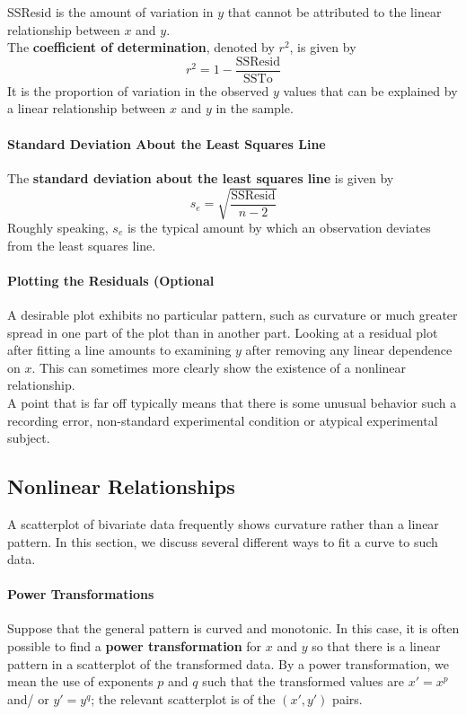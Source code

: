 \documentclass{article}
\newcommand{\p}[1]{\paragraph{#1}} %
\begin{document}
		SSResid is the amount of variation in $y$ that cannot be attributed to the linear 
		relationship between $x$ and $y$. \\
		
		The \textbf{coefficient of determination}, denoted by $r^2$, is given by
		\[ r^2 = 1- \frac{\text{SSResid}}{\text{SSTo}} \]
		It is the proportion of variation in the observed $y$ values that can be explained by a linear 
		relationship between $x$ and $y$ in the sample.
		
	\p{Standard Deviation About the Least Squares Line}
		The \textbf{standard deviation about the least squares line} is given by
		\[ s_e = \sqrt{\frac{\text{SSResid}}{n-2}} \]
		Roughly speaking, $s_e$ is the typical amount by which an observation deviates from the 
		least squares line.
		
	\p{Plotting the Residuals (Optional}
		A desirable plot exhibits no particular pattern, such as curvature or much greater spread in 
		one part of the plot than in another part. Looking at a residual plot after fitting a line 
		amounts to examining $y$ after removing any linear dependence on $x$. This can 
		sometimes more clearly show the existence of a nonlinear relationship. \\
		
		A point that is far off typically means that there is some unusual behavior such a recording 
		error, non-standard experimental condition or atypical experimental subject.	

	\subsection{Nonlinear Relationships} %
	A scatterplot of bivariate data frequently shows curvature rather than a linear pattern. In this 
	section, we discuss several different ways to fit a curve to such data.
	
	\p{Power Transformations}
		Suppose that the general pattern is curved and monotonic. In this case, it is often 
		possible to find a \textbf{power transformation} for $x$ and $y$ so that there is a linear 
		pattern in a scatterplot of the transformed data. By a power transformation, we mean the 
		use of exponents $p$ and $q$ such that the transformed values are $x\prime = x^p$ and/
		or $y\prime = y^q$; the relevant scatterplot is of the $(x\prime ,y\prime)$ pairs. \\
	
\end{document}
